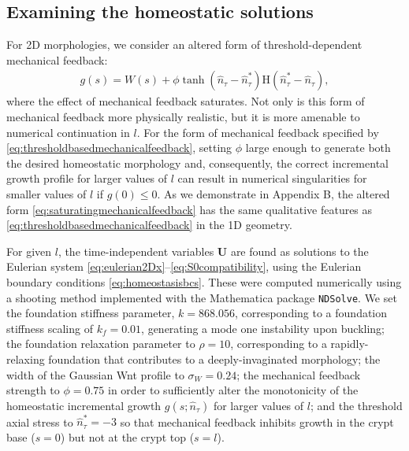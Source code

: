 \subsection{Examining the homeostatic solutions}
\label{sec:homeostasiscontinuations}
For 2D morphologies, we consider an altered form of threshold-dependent mechanical feedback:
\begin{align}
g(s) = W(s) + \phi\tanh(\hat{n}_\tau - \hat{n}_\tau^*)\mathrm{H}(\hat{n}_\tau^* - \hat{n}_\tau),\label{eq:saturatingmechanicalfeedback}
\end{align}
where the effect of mechanical feedback saturates. Not only is this form of mechanical feedback more physically realistic, but it is more amenable to numerical continuation in $l$. For the form of mechanical feedback specified by \eqref{eq:thresholdbasedmechanicalfeedback}, setting $\phi$ large enough to generate both the desired homeostatic morphology and, consequently, the correct incremental growth profile for larger values of $l$ can result in numerical singularities for smaller values of $l$ if $g(0) \le 0$. As we demonstrate in Appendix B, the altered form \eqref{eq:saturatingmechanicalfeedback} has the same qualitative features as \eqref{eq:thresholdbasedmechanicalfeedback} in the 1D geometry.

For given $l$, the time-independent variables $\mathbf{U}$ are found as solutions to the Eulerian system \eqref{eq:eulerian2Dx}--\eqref{eq:S0compatibility}, using the Eulerian boundary conditions \eqref{eq:homeostasisbcs}. These were computed numerically using a shooting method implemented with the Mathematica package \texttt{NDSolve}. %
We set the foundation stiffness parameter, $k = 868.056$, corresponding to a foundation stiffness scaling of $k_f = 0.01$, generating a mode one instability upon buckling; the foundation relaxation parameter to $\rho = 10$, corresponding to a rapidly-relaxing foundation that contributes to a deeply-invaginated morphology; the width of the Gaussian Wnt profile to $\sigma_W = 0.24$; the mechanical feedback strength to $\phi = 0.75$ in order to sufficiently alter the monotonicity of the homeostatic incremental growth $g(s; \hat{n}_\tau)$ for larger values of $l$; and the threshold axial stress to $\hat{n}_\tau^* = - 3$ so that mechanical feedback inhibits growth in the crypt base ($s = 0$) but not at the crypt top ($s = l$).


